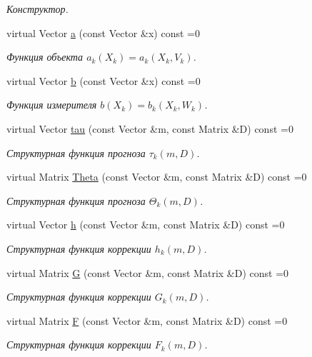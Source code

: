 \begin{DoxyCompactItemize}
\begin{DoxyCompactList}\small\item\em Конструктор. \end{DoxyCompactList}\item 
virtual Vector \hyperlink{class_core_1_1_discrete_task_a49d377fa365d5ec3e05962ee751f2d9e}{a} (const Vector \&x) const =0
\begin{DoxyCompactList}\small\item\em Функция объекта $a_k(X_k) = a_k(X_k, V_k)$. \end{DoxyCompactList}\item 
virtual Vector \hyperlink{class_core_1_1_discrete_task_a82c1aa8100dd9211739f8fd9f7d52c81}{b} (const Vector \&x) const =0
\begin{DoxyCompactList}\small\item\em Функция измерителя $b(X_k) = b_k(X_k, W_k)$. \end{DoxyCompactList}\item 
virtual Vector \hyperlink{class_core_1_1_discrete_task_aed780d7286bc88d0a2debb585601b3ca}{tau} (const Vector \&m, const Matrix \&D) const =0
\begin{DoxyCompactList}\small\item\em Структурная функция прогноза $\tau_k(m, D)$. \end{DoxyCompactList}\item 
virtual Matrix \hyperlink{class_core_1_1_discrete_task_a18906155257c5febd937f2f0c633e5ed}{Theta} (const Vector \&m, const Matrix \&D) const =0
\begin{DoxyCompactList}\small\item\em Структурная функция прогноза $\Theta_k(m, D)$. \end{DoxyCompactList}\item 
virtual Vector \hyperlink{class_core_1_1_discrete_task_a09eb964bfe445c1905758bfff4fc1537}{h} (const Vector \&m, const Matrix \&D) const =0
\begin{DoxyCompactList}\small\item\em Структурная функция коррекции $h_k(m, D)$. \end{DoxyCompactList}\item 
virtual Matrix \hyperlink{class_core_1_1_discrete_task_a5fd0bac544a6e124ad071043a37881c3}{G} (const Vector \&m, const Matrix \&D) const =0
\begin{DoxyCompactList}\small\item\em Структурная функция коррекции $G_k(m, D)$. \end{DoxyCompactList}\item 
virtual Matrix \hyperlink{class_core_1_1_discrete_task_ac55ca2cd47f0c9f7e5d3d3704becee46}{F} (const Vector \&m, const Matrix \&D) const =0
\begin{DoxyCompactList}\small\item\em Структурная функция коррекции $F_k(m, D)$. \end{DoxyCompactList}\end{DoxyCompactItemize}

